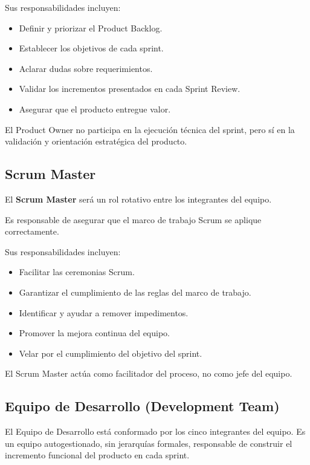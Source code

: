 \documentclass[12pt]{article}
\begin{document}
Sus responsabilidades incluyen:

\begin{itemize}
    \item Definir y priorizar el Product Backlog.
    \item Establecer los objetivos de cada sprint.
    \item Aclarar dudas sobre requerimientos.
    \item Validar los incrementos presentados en cada Sprint Review.
    \item Asegurar que el producto entregue valor.
\end{itemize}

El Product Owner no participa en la ejecución técnica del sprint, pero sí en la validación y orientación estratégica del producto.

\subsection{Scrum Master}

El \textbf{Scrum Master} será un rol rotativo entre los integrantes del equipo.

Es responsable de asegurar que el marco de trabajo Scrum se aplique correctamente.

Sus responsabilidades incluyen:

\begin{itemize}
    \item Facilitar las ceremonias Scrum.
    \item Garantizar el cumplimiento de las reglas del marco de trabajo.
    \item Identificar y ayudar a remover impedimentos.
    \item Promover la mejora continua del equipo.
    \item Velar por el cumplimiento del objetivo del sprint.
\end{itemize}

El Scrum Master actúa como facilitador del proceso, no como jefe del equipo.

\subsection{Equipo de Desarrollo (Development Team)}

El Equipo de Desarrollo está conformado por los cinco integrantes del equipo. Es un equipo autogestionado, sin jerarquías formales, responsable de construir el incremento funcional del producto en cada sprint.
\end{document}
